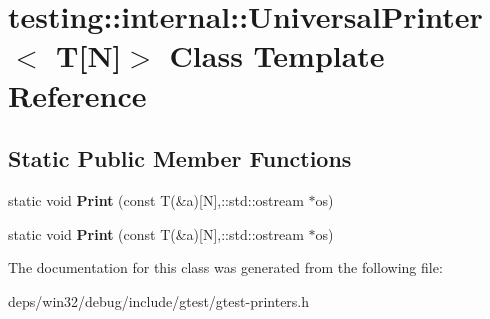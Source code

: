 \hypertarget{classtesting_1_1internal_1_1_universal_printer_3_01_t[_n]_4}{}\section{testing\+:\+:internal\+:\+:Universal\+Printer$<$ T\mbox{[}N\mbox{]}$>$ Class Template Reference}
\label{classtesting_1_1internal_1_1_universal_printer_3_01_t[_n]_4}
\subsection*{Static Public Member Functions}
\begin{DoxyCompactItemize}
\item 
\hypertarget{classtesting_1_1internal_1_1_universal_printer_3_01_t[_n]_4_a47e8cb5abce40735db381910513a4721}{}static void {\bfseries Print} (const T(\&a)\mbox{[}N\mbox{]},\+::std\+::ostream $\ast$os)\label{classtesting_1_1internal_1_1_universal_printer_3_01_t[_n]_4_a47e8cb5abce40735db381910513a4721}

\item 
\hypertarget{classtesting_1_1internal_1_1_universal_printer_3_01_t[_n]_4_a47e8cb5abce40735db381910513a4721}{}static void {\bfseries Print} (const T(\&a)\mbox{[}N\mbox{]},\+::std\+::ostream $\ast$os)\label{classtesting_1_1internal_1_1_universal_printer_3_01_t[_n]_4_a47e8cb5abce40735db381910513a4721}

\end{DoxyCompactItemize}


The documentation for this class was generated from the following file\+:\begin{DoxyCompactItemize}
\item 
deps/win32/debug/include/gtest/gtest-\/printers.\+h\end{DoxyCompactItemize}
